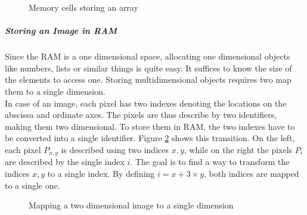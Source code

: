 \documentclass[10pt,a4paper,titlepage]{article}
\begin{document}
	\begin{figure}
		\centering
		\caption{Memory cells storing an array}
		\label{fig:memory_cells3}
	\end{figure}

	\subparagraph{Storing an Image in RAM}
	Since the RAM is a one dimensional space, allocating one dimensional objects like numbers, lists or similar things is quite easy. It suffices to know the size of the elements to access one. Storing multidimensional objects requires two map them to a single dimension.\\
	In case of an image, each pixel has two indexes denoting the locations on the abscissa and ordinate axes. The pixels are thus describe by two identifiers, making them two dimensional. To store them in RAM, the two indexes have to be converted into a single identifier. Figure \ref{fig:2d_to_1d} shows this transition. On the left, each pixel \(P_{x,y}\) is described using two indices \(x, y\), while on the right the pixels \(P_{i}\) are described by the single index \(i\). The goal is to find a way to transform the indices \(x, y\) to a single index. By defining \(i = x + 3 \times y\), both indices are mapped to a single one.
	
	\begin{figure}
		\centering
		\caption{Mapping a two dimensional image to a single dimension}
		\label{fig:2d_to_1d}
	\end{figure}
	
\end{document}
